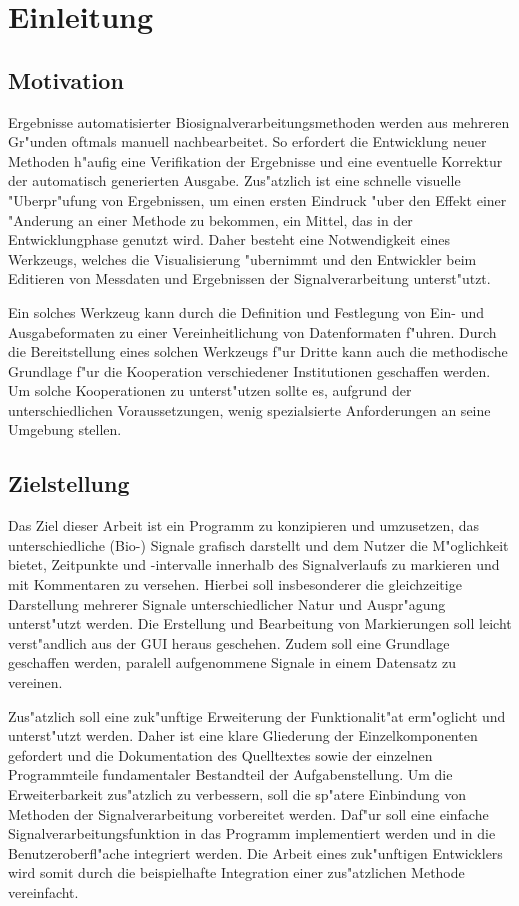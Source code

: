 \chapter{Einleitung}

\section{Motivation}

Ergebnisse automatisierter Biosignalverarbeitungsmethoden werden aus mehreren Gr"unden oftmals manuell nachbearbeitet.
So erfordert die Entwicklung neuer Methoden h"aufig eine Verifikation der Ergebnisse und eine eventuelle Korrektur der automatisch generierten Ausgabe.
Zus"atzlich ist eine schnelle visuelle "Uberpr"ufung von Ergebnissen, um einen ersten Eindruck "uber den Effekt einer "Anderung an einer Methode zu bekommen, ein Mittel, das in der Entwicklungphase genutzt wird.
Daher besteht eine Notwendigkeit eines Werkzeugs, welches die Visualisierung "ubernimmt und den Entwickler beim Editieren von Messdaten und Ergebnissen der Signalverarbeitung unterst"utzt.

Ein solches Werkzeug kann durch die Definition und Festlegung von Ein- und Ausgabeformaten zu einer Vereinheitlichung von Datenformaten f"uhren.
Durch die Bereitstellung eines solchen Werkzeugs f"ur Dritte kann auch die methodische Grundlage f"ur die Kooperation verschiedener Institutionen geschaffen werden.
Um solche Kooperationen zu unterst"utzen sollte es, aufgrund der unterschiedlichen Voraussetzungen, wenig spezialsierte Anforderungen an seine Umgebung stellen.

\section{Zielstellung}
\label{sec:zielstellung}

Das Ziel dieser Arbeit ist ein Programm zu konzipieren und umzusetzen, das unterschiedliche (Bio-) Signale grafisch darstellt und dem Nutzer die M"oglichkeit bietet, Zeitpunkte und -intervalle innerhalb des Signalverlaufs zu markieren und mit Kommentaren zu versehen.
Hierbei soll insbesonderer die gleichzeitige Darstellung mehrerer Signale unterschiedlicher Natur und Auspr"agung unterst"utzt werden.
Die Erstellung und Bearbeitung von Markierungen soll leicht verst"andlich aus der \ac{GUI} heraus geschehen.
Zudem soll eine Grundlage geschaffen werden, paralell aufgenommene Signale in einem Datensatz zu vereinen.

Zus"atzlich soll eine zuk"unftige Erweiterung der Funktionalit"at erm"oglicht und unterst"utzt werden.
Daher ist eine klare Gliederung der Einzelkomponenten gefordert und die Dokumentation des Quelltextes sowie der einzelnen Programmteile fundamentaler Bestandteil der Aufgabenstellung.
Um die Erweiterbarkeit zus"atzlich zu verbessern, soll die sp"atere Einbindung von Methoden der Signalverarbeitung vorbereitet werden.
Daf"ur soll eine einfache Signalverarbeitungsfunktion in das Programm implementiert werden und in die Benutzeroberfl"ache integriert werden.
Die Arbeit eines zuk"unftigen Entwicklers wird somit durch die beispielhafte Integration einer zus"atzlichen Methode vereinfacht.


